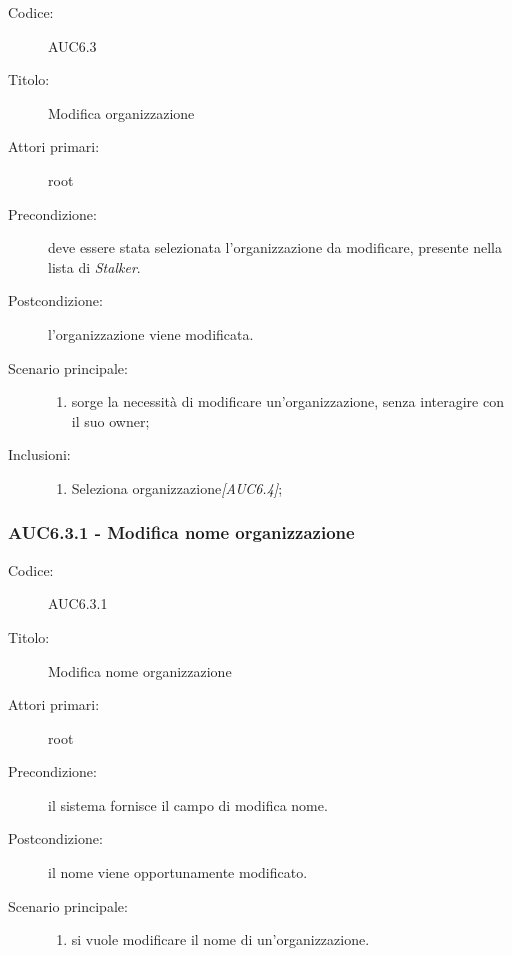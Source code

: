 \documentclass[casi-duso]{subfiles}
\begin{document}
\begin{description}
  \item[Codice:] AUC6.3
  \item[Titolo:] Modifica organizzazione
  \item[Attori primari:] root
  \item[Precondizione:] deve essere stata selezionata l'organizzazione da modificare, presente nella lista di \emph{Stalker}.
  \item[Postcondizione:] l'organizzazione viene modificata.
  \item[Scenario principale:]
  \begin{enumerate}
    \item sorge la necessità di modificare un'organizzazione, senza interagire con il suo owner;
  \end{enumerate}
  \item[Inclusioni:]
  \begin{enumerate}
    \item Seleziona organizzazione\emph{[AUC6.4]};
  \end{enumerate}
\end{description}

\subsubsection{AUC6.3.1 - Modifica nome organizzazione}%
\label{subsub:AUC6.3.1}
\begin{description}
  \item[Codice:] AUC6.3.1
  \item[Titolo:] Modifica nome organizzazione
  \item[Attori primari:] root
  \item[Precondizione:] il sistema fornisce il campo di modifica nome.
  \item[Postcondizione:] il nome viene opportunamente modificato.
  \item[Scenario principale:]
  \begin{enumerate}
    \item si vuole modificare il nome di un'organizzazione.
  \end{enumerate}
\end{description}
\end{document}

